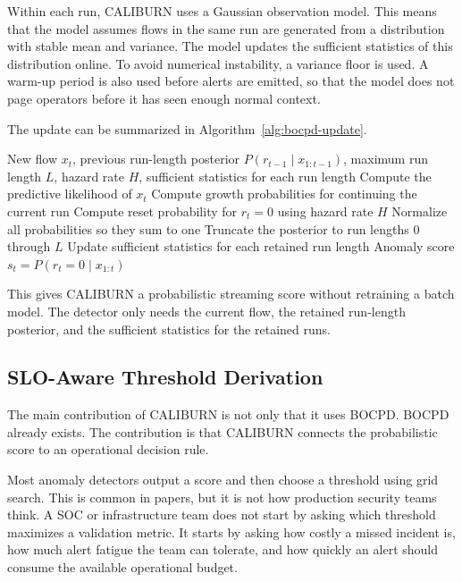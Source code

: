 \documentclass[preprint,12pt,authoryear]{elsarticle}
\newcommand{\caliburn}{CALIBURN}
\begin{document}
Within each run, \caliburn{} uses a Gaussian observation model. This means that the model assumes flows in the same run are generated from a distribution with stable mean and variance. The model updates the sufficient statistics of this distribution online. To avoid numerical instability, a variance floor is used. A warm-up period is also used before alerts are emitted, so that the model does not page operators before it has seen enough normal context.

The update can be summarized in Algorithm~\ref{alg:bocpd-update}.

\begin{algorithm}
\caption{Truncated BOCPD update}
\label{alg:bocpd-update}
\begin{algorithmic}[1]
\Require New flow $x_t$, previous run-length posterior $P(r_{t-1} \mid x_{1:t-1})$, maximum run length $L$, hazard rate $H$, sufficient statistics for each run length
    \State Compute the predictive likelihood of $x_t$
\EndFor
\State Compute growth probabilities for continuing the current run
\State Compute reset probability for $r_t = 0$ using hazard rate $H$
\State Normalize all probabilities so they sum to one
\State Truncate the posterior to run lengths $0$ through $L$
\State Update sufficient statistics for each retained run length
\State \Return Anomaly score $s_t = P(r_t = 0 \mid x_{1:t})$
\end{algorithmic}
\end{algorithm}

This gives \caliburn{} a probabilistic streaming score without retraining a batch model. The detector only needs the current flow, the retained run-length posterior, and the sufficient statistics for the retained runs.

\subsection{SLO-Aware Threshold Derivation}
\label{sec:method-threshold}

The main contribution of \caliburn{} is not only that it uses BOCPD. BOCPD already exists. The contribution is that \caliburn{} connects the probabilistic score to an operational decision rule.

Most anomaly detectors output a score and then choose a threshold using grid search. This is common in papers, but it is not how production security teams think. A SOC or infrastructure team does not start by asking which threshold maximizes a validation metric. It starts by asking how costly a missed incident is, how much alert fatigue the team can tolerate, and how quickly an alert should consume the available operational budget.
\end{document}
